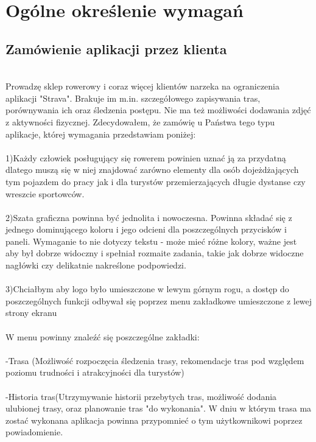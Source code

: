 	\newpage
\section{Ogólne określenie wymagań}		%

\subsection{Zamówienie aplikacji przez klienta}  %

\hspace{1cm}\\
Prowadzę sklep rowerowy i coraz więcej klientów narzeka na ograniczenia aplikacji "Strava". Brakuje im m.in. szczegółowego zapisywania tras, porównywania ich oraz śledzenia postępu. Nie ma też możliwości dodawania zdjęć z aktywności fizycznej. Zdecydowałem, że zamówię u Państwa tego typu aplikacje, której wymagania przedstawiam poniżej: \\\\
1)Każdy człowiek posługujący się rowerem powinien uznać ją za przydatną dlatego muszą się w niej znajdować zarówno elementy dla osób dojeżdżających tym pojazdem do pracy jak i dla turystów przemierzających długie dystanse czy wreszcie sportowców.\\\\
2)Szata graficzna powinna być jednolita i nowoczesna. Powinna składać się z jednego dominującego koloru i jego odcieni dla poszczególnych przycisków i paneli. Wymaganie to nie dotyczy tekstu - może mieć różne kolory, ważne jest aby był dobrze widoczny i spełniał rozmaite zadania, takie jak dobrze widoczne nagłówki czy delikatnie nakreślone podpowiedzi.\\\\
3)Chciałbym aby logo było umieszczone w lewym górnym rogu, a dostęp do poszczególnych funkcji odbywał się poprzez menu zakładkowe umieszczone z lewej strony ekranu\\\\
W menu powinny znaleźć się poszczególne zakładki: \\\\
-Trasa (Możliwość rozpoczęcia śledzenia trasy, rekomendacje tras pod względem poziomu trudności i atrakcyjności dla turystów)\\\\
-Historia tras(Utrzymywanie historii przebytych tras, możliwość dodania ulubionej trasy, oraz planowanie tras "do wykonania". W dniu w którym trasa ma zostać wykonana aplikacja powinna przypomnieć o tym użytkownikowi poprzez powiadomienie. \\\\\\\\

